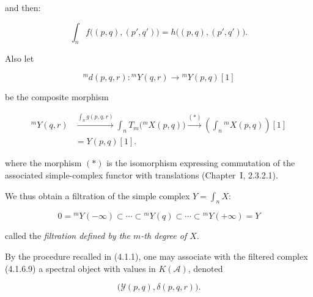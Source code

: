 \clearpage
{}%
\begingroup\small\setlength{\parskip}{0pt}\setlength{\emergencystretch}{1.5em}
\setlength{\abovedisplayskip}{4pt plus 2pt minus 2pt}%
\setlength{\belowdisplayskip}{4pt plus 2pt minus 2pt}%

\noindent and then:

\begin{equation}
\int_n f\bigl((p,q),(p',q')\bigr)
=h\bigl((p,q),(p',q')\bigr).
\tag{4.1.6.6}
\end{equation}

Also let

\begin{equation}
{}^{m}\!d(p,q,r)\colon{}^{m}\!Y(q,r)
\longrightarrow{}^{m}\!Y(p,q)[1]
\tag{4.1.6.7}
\end{equation}

be the composite morphism

\begin{equation}
\begin{aligned}
{}^{m}\!Y(q,r)
&\xrightarrow{\int_n g(p,q,r)}
\int_n T_m\bigl({}^{m}\!X(p,q)\bigr)
\xrightarrow{(*)}
\left(\int_n{}^{m}\!X(p,q)\right)[1]\\
&=Y(p,q)[1].
\end{aligned}
\tag{4.1.6.8}
\end{equation}

where the morphism $(*)$ is the isomorphism expressing commutation of the
associated simple-complex functor with translations (Chapter~I, 2.3.2.1).

We thus obtain a filtration of the simple complex $Y=\int_n X$:

\begin{equation}
0={}^{m}\!Y(-\infty)\subset\cdots\subset{}^{m}\!Y(q)
\subset\cdots\subset{}^{m}\!Y(+\infty)=Y
\tag{4.1.6.9}
\end{equation}

called the \emph{filtration defined by the $m$-th degree of $X$}.

By the procedure recalled in (4.1.1), one may associate with the filtered
complex (4.1.6.9) a spectral object with values in $K(\mathcal A)$, denoted

\begin{equation}
\bigl(\mathcal Y(p,q),\delta(p,q,r)\bigr).
\tag{4.1.6.10}
\end{equation}

